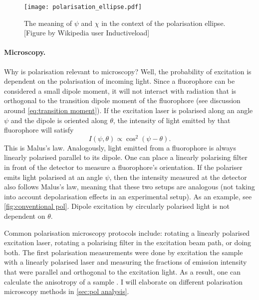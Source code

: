 \begin{figure}
	\centering
	\texttt{[image: polarisation\_ellipse.pdf]}
	\caption{The meaning of $ \psi $ and $ \chi $ in the context of the polarisation ellipse. [Figure by Wikipedia user Inductiveload]}
	\label{fig:pol ellipse}
\end{figure}

\paragraph{Microscopy.} Why is polarisation relevant to microscopy? Well, the probability of excitation is dependent on the polarisation of incoming light. Since a fluorophore can be considered a small dipole moment, it will not interact with radiation that is orthogonal to the transition dipole moment of the fluorophore (see discussion around \autoref{eq:transition moment}). If the excitation laser is polarised along an angle $ \psi $ and the dipole is oriented along $ \theta $, the intensity of light emitted by that fluorophore will satisfy 
\begin{equation}
	\label{eq:malus}
	I(\psi, \theta) \propto \cos^2(\psi-\theta).
\end{equation}
This is Malus's law. Analogously, light emitted from a fluorophore is always linearly polarised parallel to its dipole. One can place a linearly polarising filter in front of the detector to measure a fluorophore's orientation. If the polariser emits light polarised at an angle $ \psi $, then the intensity measured at the detector also follows Malus's law, meaning that these two setups are analogous (not taking into account depolarisation effects in an experimental setup). As an example, see \autoref{fig:conventional pol}. Dipole excitation by circularly polarised light is not dependent on $ \theta $. 

Common polarisation microscopy protocols include: rotating a linearly polarised excitation laser, rotating a polarising filter in the excitation beam path, or doing both. The first polarisation measurements were done by excitation the sample with a linearly polarised laser and measuring the fractions of emission intensity that were parallel and orthogonal to the excitation light. As a result, one can calculate the anisotropy of a sample \cite{Camacho2019}. I will elaborate on different polarisation microscopy methods in \autoref{sec:pol analysis}.

